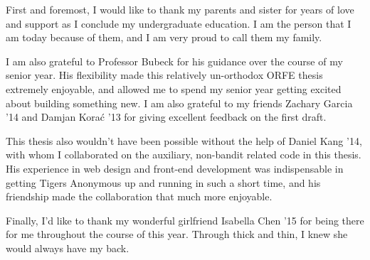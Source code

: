 First and foremost, I would like to thank my parents and sister for years of love and support as I conclude my undergraduate education. I am the person that I am today because of them, and I am very proud to call them my family.

I am also grateful to Professor Bubeck for his guidance over the course of my senior year. His flexibility made this relatively un-orthodox ORFE thesis extremely enjoyable, and allowed me to spend my senior year getting excited about building something new. I am also grateful to my friends Zachary Garcia '14 and Damjan Kora\'{c} '13 for giving excellent feedback on the first draft.

This thesis also wouldn't have been possible without the help of Daniel Kang '14, with whom I collaborated on the auxiliary, non-bandit related code in this thesis. His experience in web design and front-end development was indispensable in getting Tigers Anonymous up and running in such a short time, and his friendship made the collaboration that much more enjoyable.

Finally, I'd like to thank my wonderful girlfriend Isabella Chen '15 for being there for me throughout the course of this year. Through thick and thin, I knew she would always have my back.
